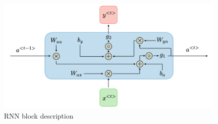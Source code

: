 \documentclass[conference]{IEEEtran}
\begin{document}
\begin{figure}[H]
    \centering
    \begin{minipage}{0.45\textwidth}
    \centering
    \includegraphics[width=1\textwidth]{figures/method/RNN_block.png}
    \caption{RNN block description}
    \label{fig_RNN_block}
    \end{minipage}
\end{figure}\par
\end{document}
